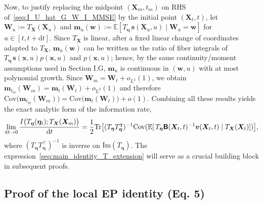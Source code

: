 Now, to justify replacing the midpoint $(\bm X_m,t_m)$ on RHS of~\eqref{seq:I_U_hat_G_W_I_MMSE} by the initial point $(\bm X_t,t)$, let $\bm W_u:=T_{\bm X}(\bm X_u)$ and $\bm m_u(\bm w):=\mathbb E[T_{\bm\eta}\,\bm s(\bm X_u,u)\mid \bm W_u=\bm w]$ for $u\in[t,t+\mathrm dt]$.
Since $T_{\bm X}$ is linear, after a fixed linear change of coordinates adapted to $T_{\bm X}$, $\bm m_u(\bm w)$ can be written as the ratio of fiber integrals of $T_{\bm\eta}\,\bm s(\bm x,u)p(\bm x,u)$ and $p(\bm x,u)$; hence, by the same continuity/moment assumptions used in Section I.G, $\bm m_u$ is continuous in $(\bm w,u)$ with at most polynomial growth. Since $\bm W_m=\bm W_t+o_{L^2}(1)$, we obtain $\bm m_{t_m}(\bm W_m)=\bm m_t(\bm W_t)+o_{L^2}(1)$
and therefore $\mathrm{Cov}\!\big(\bm m_{t_m}(\bm W_m)\big)
=
\mathrm{Cov}\!\big(\bm m_t(\bm W_t)\big)+o(1)$.
Combining all these results yields the exact analytic form of the information rate,
\begin{equation}
    \lim_{\mathrm dt\rightarrow0}\frac{
    I\big(T_{\bm\eta}(\bm\eta_t);T_{\bm X}(\bm X_m)\big)}{\mathrm dt}
    =\frac{1}{2}\mathrm{Tr}\big[(T_{\bm\eta}T_{\bm\eta}^\intercal)^{-1}\mathrm{Cov}
    (\mathbb E[\,T_{\bm\eta}\boldsymbol{\mathsf{B}}(\bm X_t,t)^{-1} \bm v(\bm X_t,t)\mid T_{\bm X}(\bm X_t)])\big],
    \label{seq:main_identity_T_extension}
\end{equation}
where $(T_{\bm\eta}T_{\bm\eta}^\intercal)^{-1}$ is inverse on $\mathrm{Im}(T_{\bm\eta})$. The expression~\eqref{seq:main_identity_T_extension} will serve as a crucial building block in subsequent proofs.


\subsection{Proof of the local EP identity (Eq. 5)}
\vspace*{-0.6\baselineskip}

